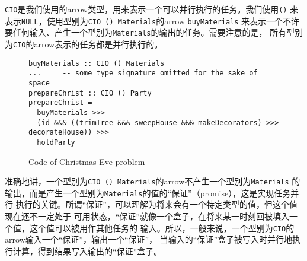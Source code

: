 \documentclass[conference]{IEEEtran}
\begin{document}
\texttt{CIO}是我们使用的arrow类型，用来表示一个可以并行执行的任务。我们使用\texttt{()}
来表示\texttt{NULL}，使用型别为\texttt{CIO () Materials}的arrow \texttt{buyMaterials}
来表示一个不许要任何输入、产生一个型别为\texttt{Materials}的输出的任务。需要注意的是，
所有型别为\texttt{CIO}的arrow表示的任务都是并行执行的。
\begin{figure*}
  \begin{verbatim}
buyMaterials :: CIO () Materials
...     -- some type signature omitted for the sake of space
prepareChrist :: CIO () Party
prepareChrist = 
  buyMaterials >>>
  (id &&& ((trimTree &&& sweepHouse &&& makeDecorators) >>> decorateHouse)) >>>
  holdParty
  \end{verbatim}
  \caption{Code of Christmas Eve problem}
  \label{fig:code-christmas}
\end{figure*}

准确地讲，一个型别为\texttt{CIO () Materials}的arrow不产生一个型别为\texttt{Materials}
的输出，而是产生一个型别为\texttt{Materials}的值的“保证”（promise），这是实现任务并行
执行的关键。所谓“保证”，可以理解为将来会有一个特定类型的值，但这个值现在还不一定处于
可用状态，“保证”就像一个盒子，在将来某一时刻回被填入一个值，这个值可以被用作其他任务的
输入。所以，一般来说，一个型别为\texttt{CIO}的arrow输入一个“保证”，输出一个“保证”，
当输入的“保证”盒子被写入时并行地执行计算，得到结果写入输出的“保证”盒子。
\end{document}
